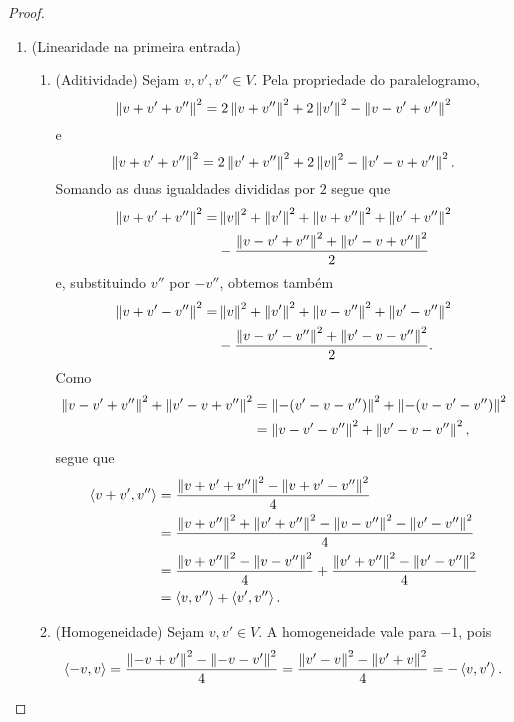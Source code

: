 \begin{proof}
	\begin{enumerate}
		\item (Linearidade na primeira entrada)
			\begin{enumerate}
				\item (Aditividade) Sejam $v,v',v'' \in V$. Pela propriedade do paralelogramo,
					\begin{equation*}
						\left\Vert{v+v'+v''}\right\Vert^2 = 2\left\Vert{v+v''}\right\Vert^2 + 2\left\Vert{v'}\right\Vert^2 - \left\Vert{v-v'+v''}\right\Vert^2
					\end{equation*}
					e
					\begin{equation*}
						\left\Vert{v+v'+v''}\right\Vert^2 = 2\left\Vert{v'+v''}\right\Vert^2 + 2\left\Vert{v}\right\Vert^2 - \left\Vert{v'-v+v''}\right\Vert^2.
					\end{equation*}
				Somando as duas igualdades divididas por $2$ segue que
					\begin{align*}
						\left\Vert{v+v'+v''}\right\Vert^2 =& \left\Vert{v}\right\Vert^2 + \left\Vert{v'}\right\Vert^2 + \left\Vert{v+v''}\right\Vert^2 + \left\Vert{v'+v''}\right\Vert^2 \\
							&- \frac{\left\Vert{v-v'+v''}\right\Vert^2 + \left\Vert{v'-v+v''}\right\Vert^2}{2}
					\end{align*}
				e, substituindo $v''$ por $-v''$, obtemos também
					\begin{align*}
						\left\Vert{v+v'-v''}\right\Vert^2 =& \left\Vert{v}\right\Vert^2 + \left\Vert{v'}\right\Vert^2 + \left\Vert{v-v''}\right\Vert^2 + \left\Vert{v'-v''}\right\Vert^2 \\
							&- \frac{\left\Vert{v-v'-v''}\right\Vert^2 + \left\Vert{v'-v-v''}\right\Vert^2}{2}.
					\end{align*}
				Como
					\begin{align*}
						\left\Vert{v-v'+v''}\right\Vert^2 + \left\Vert{v'-v+v''}\right\Vert^2 &= \left\Vert{-(v'-v-v'')}\right\Vert^2 + \left\Vert{-(v-v'-v'')}\right\Vert^2 \\
							&= \left\Vert{v-v'-v''}\right\Vert^2 + \left\Vert{v'-v-v''}\right\Vert^2,
					\end{align*}
				segue que
					\begin{align*}
						\left\langle{v+v'},{v''}\right\rangle &= \frac{\left\Vert{v+v'+v''}\right\Vert^2 - \left\Vert{v+v'-v''}\right\Vert^2}{4} \\
							&= \frac{\left\Vert{v+v''}\right\Vert^2 + \left\Vert{v'+v''}\right\Vert^2 - \left\Vert{v-v''}\right\Vert^2 - \left\Vert{v'-v''}\right\Vert^2}{4} \\
							&= \frac{\left\Vert{v+v''}\right\Vert^2 - \left\Vert{v-v''}\right\Vert^2}{4} + \frac{\left\Vert{v'+v''}\right\Vert^2 - \left\Vert{v'-v''}\right\Vert^2}{4} \\
							&= \left\langle{v},{v''}\right\rangle + \left\langle{v'},{v''}\right\rangle.
					\end{align*}

				\item (Homogeneidade) Sejam $v,v' \in V$. A homogeneidade vale para $-1$, pois
					\begin{align*}
						\left\langle{-v},{v}\right\rangle = \frac{\left\Vert{-v+v'}\right\Vert^2 - \left\Vert{-v-v'}\right\Vert^2}{4} = \frac{\left\Vert{v'-v}\right\Vert^2 - \left\Vert{v'+v}\right\Vert^2}{4} = -\left\langle{v},{v'}\right\rangle.
					\end{align*}
				

\end{enumerate}
\end{enumerate}
\end{proof}
